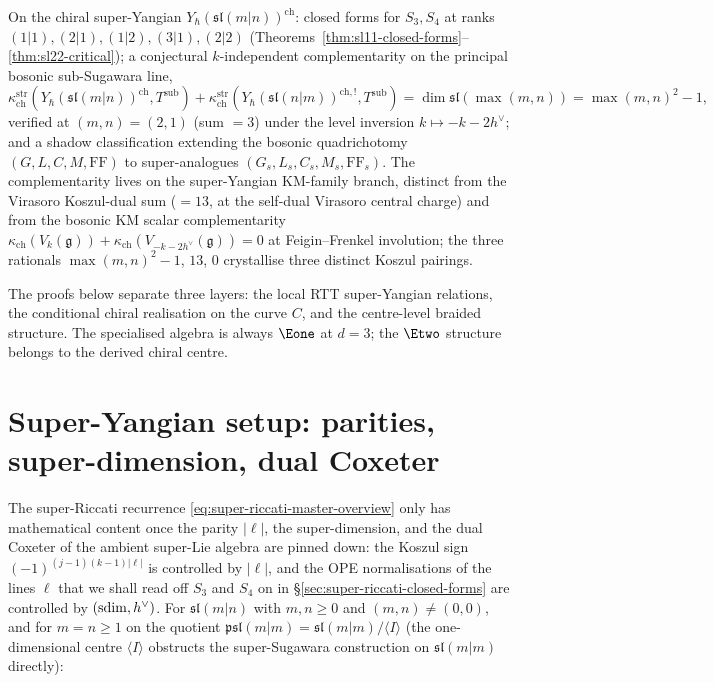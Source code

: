 On the chiral super-Yangian $Y_\hbar(\mathfrak{sl}(m|n))^{\mathrm{ch}}$:
closed forms for $S_3, S_4$ at ranks $(1|1), (2|1), (1|2), (3|1),
(2|2)$ (Theorems~\ref{thm:sl11-closed-forms}--\ref{thm:sl22-critical});
a conjectural $k$-independent complementarity on the principal
bosonic sub-Sugawara line,
\[
\kappa_{\mathrm{ch}}^{\mathrm{str}}(Y_\hbar(\mathfrak{sl}(m|n))^{\mathrm{ch}}, T^{\mathrm{sub}})
+ \kappa_{\mathrm{ch}}^{\mathrm{str}}(Y_\hbar(\mathfrak{sl}(n|m))^{\mathrm{ch}, !}, T^{\mathrm{sub}})
= \dim \mathfrak{sl}(\max(m, n)) = \max(m, n)^2 - 1,
\]
verified at $(m, n) = (2, 1)$ (sum $= 3$) under the level inversion
$k \mapsto -k - 2 h^\vee$; and a shadow classification extending the
bosonic quadrichotomy $(G, L, C, M, \mathrm{FF})$ to super-analogues
$(G_s, L_s, C_s, M_s, \mathrm{FF}_s)$. The complementarity lives on
the super-Yangian KM-family branch, distinct from the Virasoro
Koszul-dual sum ($= 13$, at the self-dual Virasoro central charge)
and from the bosonic KM scalar complementarity
$\kappa_{\mathrm{ch}}(V_k(\mathfrak{g})) +
\kappa_{\mathrm{ch}}(V_{-k - 2 h^\vee}(\mathfrak{g})) = 0$ at
Feigin--Frenkel involution; the three rationals $\max(m,n)^2 - 1$,
$13$, $0$ crystallise three distinct Koszul pairings.

The proofs below separate three layers: the local RTT super-Yangian
relations, the conditional chiral realisation on the curve $C$, and the
centre-level braided structure. The specialised algebra is always
$\Eone$ at $d = 3$; the $\Etwo$ structure belongs to the derived chiral
centre.

\section{Super-Yangian setup: parities, super-dimension, dual Coxeter}
\label{sec:super-riccati-setup}

The super-Riccati recurrence \eqref{eq:super-riccati-master-overview}
only has mathematical content once the parity $|\ell|$, the
super-dimension, and the dual Coxeter of the ambient super-Lie
algebra are pinned down: the Koszul sign
$(-1)^{(j-1)(k-1)|\ell|}$ is controlled by $|\ell|$, and the OPE
normalisations of the lines $\ell$ that we shall read off $S_3$ and
$S_4$ on in \S\ref{sec:super-riccati-closed-forms} are controlled by
$(\mathrm{sdim}, h^\vee)$. For $\mathfrak{sl}(m|n)$ with $m, n \ge 0$ and
$(m, n) \ne (0, 0)$, and for $m = n \ge 1$ on the quotient
$\mathfrak{psl}(m|m) = \mathfrak{sl}(m|m)/\langle I\rangle$ (the
one-dimensional centre $\langle I\rangle$ obstructs the super-Sugawara
construction on $\mathfrak{sl}(m|m)$ directly):

